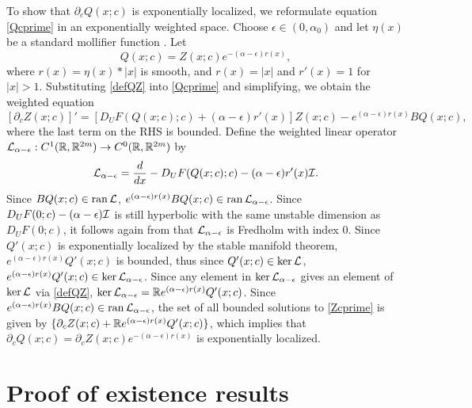 \documentclass[10pt,reqno]{amsart}
\theoremstyle{plain}
\theoremstyle{definition}
\theoremstyle{remark}
\numberwithin{theorem}{section}
\numberwithin{equation}{section}
\begin{document}
To show that $\partial_c Q(x; c)$ is exponentially localized, we reformulate equation \cref{Qcprime} in an exponentially weighted space. Choose $\epsilon \in (0,\alpha_0)$ and let $\eta(x)$ be a standard mollifier function \cite[Section~C.5]{Evans2010}. Let
\begin{equation}\label{defQZ}
Q(x; c) = Z(x; c) e^{-(\alpha - \epsilon)r(x)},
\end{equation}
where $r(x) = \eta(x) * |x|$ is smooth, and $r(x) = |x|$ and $r'(x) = 1$ for $|x| > 1$. Substituting \cref{defQZ} into \cref{Qcprime} and simplifying, we obtain the weighted equation
\begin{equation}\label{Zcprime}
[\partial_c Z(x; c)]' = [D_U F(Q(x;c); c) + (\alpha - \epsilon) r'(x) ] Z(x; c) - e^{(\alpha - \epsilon)r(x)} B Q(x;c),
\end{equation}
where the last term on the RHS is bounded. Define the weighted linear operator $\mathcal{L}_{\alpha - \epsilon}: C^1(\mathbb{R}, \mathbb{R}^{2m}) \rightarrow C^0(\mathbb{R}, \mathbb{R}^{2m})$ by
\begin{equation}\label{defLtvalpha}
\mathcal{L}_{\alpha - \epsilon} = \frac{d}{dx} - D_U F(Q(x;c); c) - (\alpha - \epsilon) r'(x) \mathcal{I}.
\end{equation}
Since $B Q(x;c) \in \operatorname{ran} \mathcal{L}$, $e^{(\alpha - \epsilon)r(x)} B Q(x;c) \in \operatorname{ran} \mathcal{L}_{\alpha - \epsilon}$. Since $D_U F(0; c)-(\alpha-\epsilon)\mathcal{I}$ is still hyperbolic with the same unstable dimension as $D_U F(0; c)$, it follows again from \cite[Lemma 4.2]{Palmer1984} that $\mathcal{L}_{\alpha - \epsilon}$ is Fredholm with index 0. Since $Q'(x; c)$ is exponentially localized by the stable manifold theorem, $e^{(\alpha - \epsilon)r(x)} Q'(x; c)$ is bounded, thus since $Q'(x; c) \in \mathop\mathrm{ker}\nolimits \mathcal{L}$, $e^{(\alpha - \epsilon)r(x)} Q'(x; c) \in \mathop\mathrm{ker}\nolimits \mathcal{L}_{\alpha - \epsilon}$. Since any element in $\mathop\mathrm{ker}\nolimits \mathcal{L}_{\alpha - \epsilon}$ gives an element of $\mathop\mathrm{ker}\nolimits \mathcal{L}$ via \cref{defQZ}, $\mathop\mathrm{ker}\nolimits \mathcal{L}_{\alpha - \epsilon} = \mathbb{R} e^{(\alpha - \epsilon)r(x)} Q'(x; c)$. Since $e^{(\alpha - \epsilon)r(x)} B Q(x;c) \in \operatorname{ran} \mathcal{L}_{\alpha - \epsilon}$, the set of all bounded solutions to \cref{Zcprime} is given by $\{ \partial_c Z(x; c) + \mathbb{R} e^{(\alpha - \epsilon)r(x)} Q'(x;c) \}$, which implies that $\partial_c Q(x; c) = \partial_c Z (x; c) e^{-(\alpha - \epsilon)r(x)}$ is exponentially localized.

\section{Proof of existence results}\label{sec:existproof}
\end{document}
